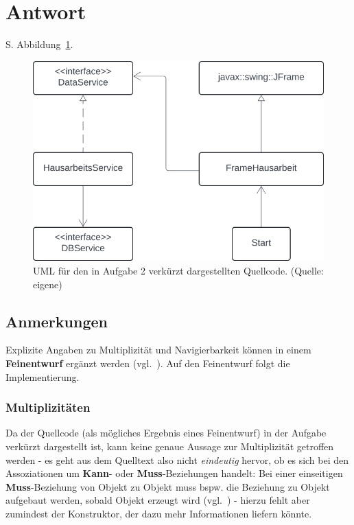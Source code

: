 \section{Antwort}

S. Abbildung~\ref{fig:aufgabe2}.\\

\begin{figure}
    \centering
    \includegraphics[scale=0.5]{chapters/aufgabe 2/img/aufgabe2}
    \caption{UML für den in Aufgabe 2 verkürzt dargestellten Quellcode. (Quelle: eigene)}
    \label{fig:aufgabe2}
\end{figure}

\subsection{Anmerkungen}
Explizite Angaben zu Multiplizität und Navigierbarkeit können in einem \textbf{Feinentwurf} ergänzt werden (vgl.~\cite[415]{Bal05}). Auf den Feinentwurf folgt die Implementierung.\\

\subsubsection*{Multiplizitäten}
Da der Quellcode (als mögliches Ergebnis eines Feinentwurf) in der Aufgabe verkürzt dargestellt ist, kann keine genaue Aussage zur Multiplizität getroffen werden - es geht aus dem Quelltext also nicht \textit{eindeutig} hervor, ob es sich bei den Assoziationen um \textbf{Kann}- oder \textbf{Muss}-Beziehungen handelt: Bei einer einseitigen \textbf{Muss}-Beziehung von Objekt  zu Objekt  muss bspw. die Beziehung zu Objekt  aufgebaut werden, sobald Objekt  erzeugt wird (vgl.~\cite[43]{Bal05}) - hierzu fehlt aber zumindest der Konstruktor, der dazu mehr Informationen liefern könnte.\\

